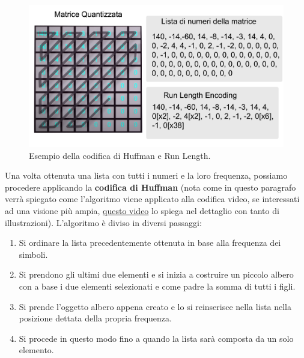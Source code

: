 \documentclass[a4paper,12pt, oneside]{article}
\begin{document}
\begin{figure}[h]
    \centering
    \includegraphics[width=1\textwidth]{images/huffman-example.png}
    \caption{Esempio della codifica di Huffman e Run Length.}
    \label{fig:huffman_example}
\end{figure}

Una volta ottenuta una lista con tutti i numeri e la loro frequenza, possiamo procedere applicando
la \textbf{codifica di Huffman} (nota come in questo paragrafo verrà spiegato come l'algoritmo
viene applicato alla codifica video, se interessati ad una visione più ampia,
\href{https://www.youtube.com/watch?v=JsTptu56GM8}{questo video} lo spiega nel dettaglio con tanto
di illustrazioni). L'algoritmo è diviso in diversi passaggi:

\begin{enumerate}
    \item Si ordinare la lista precedentemente ottenuta in base alla frequenza dei simboli.
    \item Si prendono gli ultimi due elementi e si inizia a costruire un piccolo albero con a base i due
    elementi selezionati e come padre la somma di tutti i figli.
    \item Si prende l'oggetto albero appena creato e lo si reinserisce nella lista nella posizione dettata
    della propria frequenza.
    \item Si procede in questo modo fino a quando la lista sarà composta da un solo elemento.
\end{enumerate}
\end{document}
